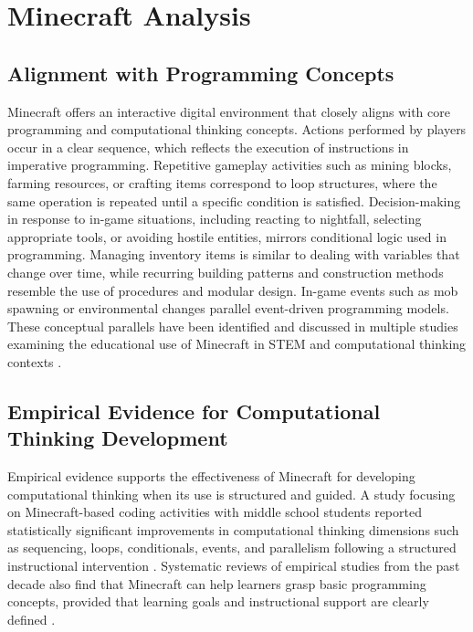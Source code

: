\section{Minecraft Analysis}

\subsection{Alignment with Programming Concepts}

Minecraft offers an interactive digital environment that closely aligns with core programming and computational thinking concepts. 
Actions performed by players occur in a clear sequence, which reflects the execution of instructions in imperative programming. 
Repetitive gameplay activities such as mining blocks, farming resources, or crafting items correspond to loop structures, where the same operation is repeated until a specific condition is satisfied. 
Decision-making in response to in-game situations, including reacting to nightfall, selecting appropriate tools, or avoiding hostile entities, mirrors conditional logic used in programming. 
Managing inventory items is similar to dealing with variables that change over time, while recurring building patterns and construction methods resemble the use of procedures and modular design. 
In-game events such as mob spawning or environmental changes parallel event-driven programming models. 
These conceptual parallels have been identified and discussed in multiple studies examining the educational use of Minecraft in STEM and computational thinking contexts \cite{md_shamsudin_crafting_2024, nebel_mining_2016}.

\subsection{Empirical Evidence for Computational Thinking Development}

Empirical evidence supports the effectiveness of Minecraft for developing computational thinking when its use is structured and guided. 
A study focusing on Minecraft-based coding activities with middle school students reported statistically significant improvements in computational thinking dimensions such as sequencing, loops, conditionals, events, and parallelism following a structured instructional intervention \cite{tablatin_using_2023}. 
Systematic reviews of empirical studies from the past decade also find that Minecraft can help learners grasp basic programming concepts, provided that learning goals and instructional support are clearly defined \cite{nebel_mining_2016, md_shamsudin_crafting_2024}.

